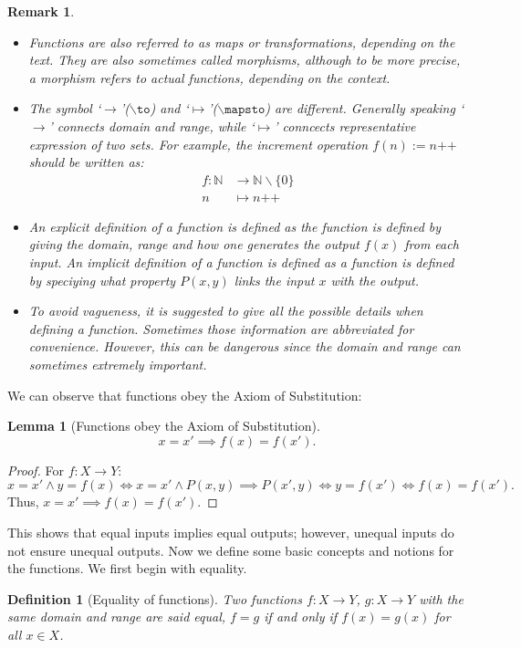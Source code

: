 \documentclass[a4paper]{book}
\newtheorem*{proof}{\textit{Proof.}}
\theoremstyle{break}
\newtheorem{definition}{Definition}[section]
\newtheorem{lemma}{Lemma}[section]
\newtheorem{remark}{Remark}[section]
\begin{document}
			\begin{remark}~
				\begin{itemize}
					\item Functions are also referred to as maps or transformations, depending on the text. They are also sometimes called morphisms, although to be more precise, a morphism refers to actual functions, depending on the context.
					\item The symbol `$\to$'($\backslash\texttt{to}$) and `$\mapsto$'($\backslash\texttt{mapsto}$) are different. Generally speaking `$\to$' connects domain and range, while `$\mapsto$' conncects representative expression of two sets. For example, the increment operation $f(n):=n\texttt{++}$ should be written as:
					$$
					\begin{aligned}
						f:\mathbb{N}&\to\mathbb{N}\backslash\{0\}\\
						n&\mapsto n\texttt{++}
					\end{aligned}
					$$
					\item An explicit definition of a function is defined as the function is defined by giving the domain, range and how one generates the output $f(x)$ from each input. An implicit definition of a function is defined as a function is defined by speciying what property $P(x,y)$ links the input $x$ with the output.
					\item To avoid vagueness, it is suggested to give all the possible details when defining a function. Sometimes those information are abbreviated for convenience. However, this can be dangerous since the domain and range can sometimes extremely important.
				\end{itemize}
			\end{remark}
			We can observe that functions obey the Axiom of Substitution:
			\begin{lemma}[Functions obey the Axiom of Substitution]
				$$x=x'\implies f(x)=f(x').$$
			\end{lemma}
			\begin{proof}
				For $f:X\to Y$: $$x=x'\land y=f(x)\iff x=x'\land P(x,y)\implies P(x',y)\iff y=f(x')\iff f(x)=f(x').$$ Thus, $x=x'\implies f(x)=f(x')$.
			\end{proof}
			This shows that equal inputs implies equal outputs; however, unequal inputs do not ensure unequal outputs.
			Now we define some basic concepts and notions for the functions. We first begin with equality.
			\begin{definition}[Equality of functions]
				Two functions $f:X\to Y$, $g:X\to Y$ with the same domain and range are said equal, $f=g$ if and only if $f(x)=g(x)$ for all $x\in X$.
			\end{definition}
\end{document}
